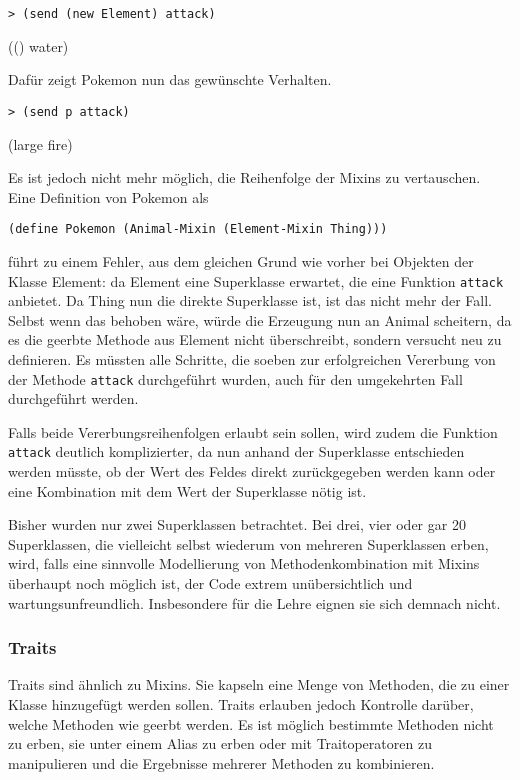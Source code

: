 \begin{lstlisting}
> (send (new Element) attack)
\end{lstlisting}
{\rsymbol (() water)}

Dafür zeigt Pokemon nun das gewünschte Verhalten.
\begin{lstlisting}
> (send p attack)
\end{lstlisting}
{\rsymbol (large fire)}

Es ist jedoch nicht mehr möglich, die Reihenfolge der Mixins zu vertauschen. Eine Definition von Pokemon als

\begin{lstlisting}
(define Pokemon (Animal-Mixin (Element-Mixin Thing)))
\end{lstlisting}

führt zu einem Fehler, aus dem gleichen Grund wie vorher bei Objekten der Klasse Element: da Element eine Superklasse erwartet, die eine Funktion \texttt{attack} anbietet. Da Thing nun die direkte Superklasse ist, ist das nicht mehr der Fall. Selbst wenn das behoben wäre, würde die Erzeugung nun an Animal scheitern, da es die geerbte Methode aus Element nicht überschreibt, sondern versucht neu zu definieren. Es müssten alle Schritte, die soeben zur erfolgreichen Vererbung von der Methode \texttt{attack} durchgeführt wurden, auch für den umgekehrten Fall durchgeführt werden. 

Falls beide Vererbungsreihenfolgen erlaubt sein sollen, wird zudem die Funktion \texttt{attack} deutlich komplizierter, da nun anhand der Superklasse entschieden werden müsste, ob der Wert des Feldes direkt zurückgegeben werden kann oder eine Kombination mit dem Wert der Superklasse nötig ist.

Bisher wurden nur zwei Superklassen betrachtet. Bei drei, vier oder gar 20 Superklassen, die vielleicht selbst wiederum von mehreren Superklassen erben, wird, falls eine sinnvolle Modellierung von Methodenkombination mit Mixins überhaupt noch möglich ist, der Code extrem unübersichtlich und wartungsunfreundlich. Insbesondere für die Lehre eignen sie sich demnach nicht.

\subsubsection{Traits}
Traits sind ähnlich zu Mixins. Sie kapseln eine Menge von Methoden, die zu einer Klasse hinzugefügt werden sollen. Traits erlauben jedoch Kontrolle darüber, welche Methoden wie geerbt werden. Es ist möglich bestimmte Methoden nicht zu erben, sie unter einem Alias zu erben oder mit Traitoperatoren zu manipulieren und die Ergebnisse mehrerer Methoden zu kombinieren.

